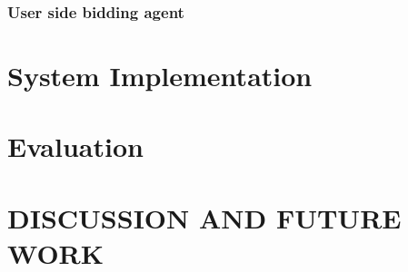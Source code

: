 \documentclass[a4paper,11pt,twocolumn]{article}
\begin{document}
\subsubsection{User side bidding agent}



\section{System Implementation}

\section{Evaluation}



\section{DISCUSSION AND FUTURE WORK}
\end{document}
